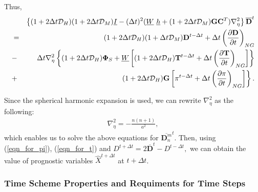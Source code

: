 Thus, \begin{eqnarray}
      & &\left\{ ( 1+2\Delta t {\mathcal D}_H )( 1+2\Delta t {\mathcal D}_M )
           \underline{I}
      - ( \Delta t )^{2}  ( \underline{W} \ \underline{h}
           + (1+2\Delta t {\mathcal D}_M)
             {\mathbf{G}} {\mathbf{C}}^{T} ) \nabla^{2}_{\eta}
  \right\}
      \overline{ {\mathbf{D}} }^{t} \notag\\
  &=& ( 1+2\Delta t {\mathcal D}_H )( 1+\Delta t {\mathcal D}_M )
       {\mathbf{D}}^{t-\Delta t}
  + \Delta t
     \left( \frac{\partial {\mathbf{D}}}{\partial t} \right)_{NG}  \notag\\
  &-&  \Delta t \nabla^{2}_{\eta}
                   \left\{  ( 1+2\Delta t {\mathcal D}_H ) {\mathbf{\Phi}}_{S}
                          + \underline{W}
                            \left[ ( 1+2\Delta t {\mathcal D}_H )
                                    {\mathbf{T}}^{t-\Delta t}
                                  + \Delta t
                                      \left( \frac{\partial {\mathbf{T}}}
                                                  {\partial t}
                                      \right)_{NG} \right]
                   \right\} \notag \\
                 &+& \hspace{1.4cm} \left. ( 1+2\Delta t {\mathcal D}_H ) {\mathbf{G}}
                            \left[ \pi^{t-\Delta t}
                                  + \Delta t \left( \frac{\partial \pi}{\partial t}
                                  \right)_{NG}  \right]
                                  \right\}.   \end{eqnarray}

Since the spherical harmonic expansion is used, we can rewrite \(\nabla_{\eta}^2\) as the following: \begin{eqnarray}
\nabla_{\eta}^2=-\frac{n(n+1)}{a^2},   \end{eqnarray} which enables us to solve the above equations for \(\overline{ {\mathbf{D}}_n^m }^{t}\). Then, using (\ref{eqn_for_pi}),
(\ref{eqn_for_t}) and \(D^{t+\Delta t} = 2\overline{ {\mathbf{D}} }^{t} - D^{t-\Delta t},\) we can obtain the value of prognostic variables \(\hat{X}^{t+\Delta t}\) at \(t+\Delta t\).

\hypertarget{time-scheme-properties-and-requiments-for-time-steps}{%
\subsubsection{Time Scheme Properties and Requiments for Time Steps}\label{time-scheme-properties-and-requiments-for-time-steps}}


